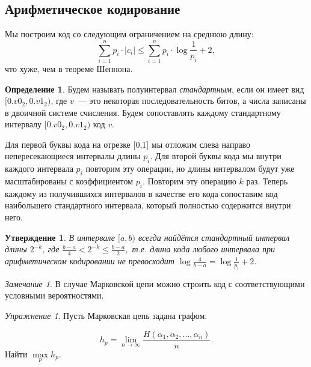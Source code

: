 \documentclass[12pt]{article}
\newcommand{\seqn}[2]{{#1}_1,{#1}_2,\dotsc,{#1}_{#2}}
\theoremstyle{definition}
\newtheorem{definition}{Определение}
\theoremstyle{plain}
\newtheorem{statement}{Утверждение}[section]
\theoremstyle{remark}
\newtheorem{exercise}{Упражнение}[section]
\newtheorem{remark}{Замечание}[section]
\begin{document}
\subsection{Арифметическое кодирование}
Мы построим код со следующим ограничением на среднюю длину:
\[
    \sum_{i=1}^n p_i\cdot|c_i|\le \sum_{i=1}^n p_i\cdot \log\frac1{p_i} + 2, 
\]
что хуже, чем в теореме Шеннона.

\begin{definition}
    Будем называть полуинтервал \emph{стандартным}, если он имеет вид
    $[0.v0_2, 0.v1_2)$, где $v$~--- это некоторая последовательность битов,
    а числа записаны в двоичной системе счисления. Будем сопоставлять каждому
    стандартному интервалу $[0.v0_2, 0.v1_2)$ код $v$.

    Для первой буквы кода на отрезке [0,1] мы отложим слева направо непересекающиеся интервалы длины
    $p_i$. Для второй буквы кода мы внутри каждого интервала $p_i$ повторим эту
    операции, но длины интервалом будут уже масштабированы с коэффициентом
    $p_i$. Повторим эту операцию $k$ раз. Теперь каждому из получившихся
    интервалов в качестве его кода сопоставим код наибольшего 
    стандартного интервала, который полностью содержится внутри него.
\end{definition}
\begin{statement}
    В интервале $[a,b)$ всегда найдётся стандартный интервал длины $2^{-k}$, где
    \(
    \frac{b-a}{4}<2^{-k}\le \frac{b-a}{2},
    \)
    т.е. длина кода любого интервала при арифметическом кодировании не
    превосходит $\log \frac{4}{b-a} = \log \frac{1}{p_i} + 2$.
\end{statement}

\begin{remark}
    В случае Марковской цепи можно строить код с соответствующими условными
    вероятностями.
\end{remark}
\begin{exercise}
Пусть Марковская цепь задана графом.
\begin{center}
\end{center}
\[
h_p = \lim_{n\to\infty} \frac{H(\seqn{\alpha}{n})}{n}.
\]
Найти $\max\limits_p h_p$.
\end{exercise}
\end{document}
